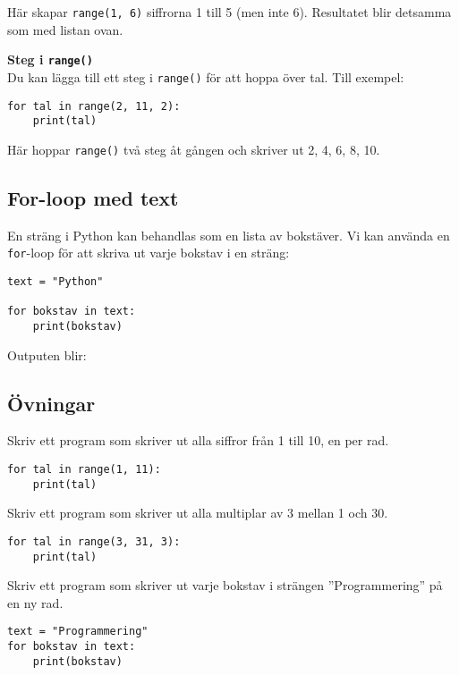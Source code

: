 Här skapar \texttt{range(1, 6)} siffrorna 1 till 5 (men inte 6). Resultatet blir detsamma som med listan ovan.

\textbf{Steg i \texttt{range()}}\\
Du kan lägga till ett steg i \texttt{range()} för att hoppa över tal. Till exempel:
\begin{lstlisting}
for tal in range(2, 11, 2):
    print(tal)
\end{lstlisting}
Här hoppar \texttt{range()} två steg åt gången och skriver ut 2, 4, 6, 8, 10.


\subsection{For-loop med text}
En sträng i Python kan behandlas som en lista av bokstäver. Vi kan använda en \texttt{for}-loop för att skriva ut varje bokstav i en sträng:

\begin{lstlisting}[title=Exempel: Loopa över en sträng]
text = "Python"

for bokstav in text:
    print(bokstav)
\end{lstlisting}

Outputen blir:



\subsection{Övningar}
\begin{exercise}
Skriv ett program som skriver ut alla siffror från 1 till 10, en per rad.
\end{exercise}
\begin{solution}
\begin{lstlisting}
for tal in range(1, 11):
    print(tal)
\end{lstlisting}
\end{solution}

\begin{exercise}
Skriv ett program som skriver ut alla multiplar av 3 mellan 1 och 30.
\end{exercise}
\begin{solution}
\begin{lstlisting}
for tal in range(3, 31, 3):
    print(tal)
\end{lstlisting}
\end{solution}

\begin{exercise}
Skriv ett program som skriver ut varje bokstav i strängen ''Programmering'' på en ny rad.
\end{exercise}
\begin{solution}
\begin{lstlisting}
text = "Programmering"
for bokstav in text:
    print(bokstav)
\end{lstlisting}
\end{solution}

